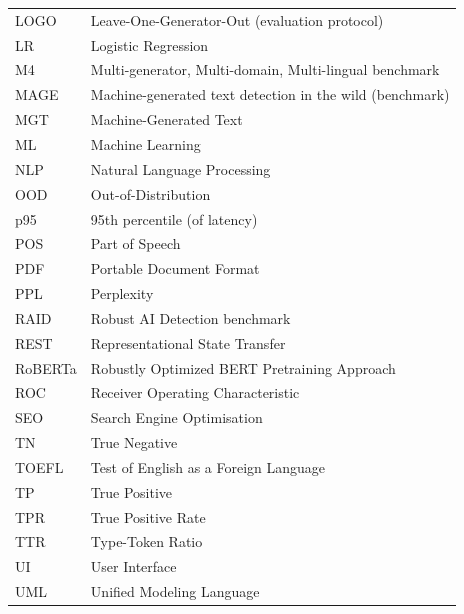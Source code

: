 \begin{longtable}{@{}p{3.0cm}p{11.0cm}@{}}
LOGO    & Leave-One-Generator-Out (evaluation protocol) \\
LR      & Logistic Regression \\
M4      & Multi-generator, Multi-domain, Multi-lingual benchmark \\
MAGE    & Machine-generated text detection in the wild (benchmark) \\
MGT     & Machine-Generated Text \\
ML      & Machine Learning \\
NLP     & Natural Language Processing \\
OOD     & Out-of-Distribution \\
p95     & 95th percentile (of latency) \\
POS     & Part of Speech \\
PDF     & Portable Document Format \\
PPL     & Perplexity \\
RAID    & Robust AI Detection benchmark \\
REST    & Representational State Transfer \\
RoBERTa & Robustly Optimized BERT Pretraining Approach \\
ROC     & Receiver Operating Characteristic \\
SEO     & Search Engine Optimisation \\
TN      & True Negative \\
TOEFL   & Test of English as a Foreign Language \\
TP      & True Positive \\
TPR     & True Positive Rate \\
TTR     & Type-Token Ratio \\
UI      & User Interface \\
UML     & Unified Modeling Language \\
\end{longtable}
\endgroup
\clearpage
